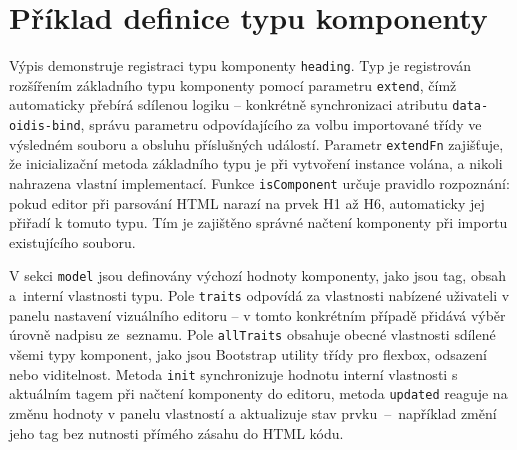 \chapter{Příklad definice typu komponenty}
\label{lst:createtype}

Výpis demonstruje registraci typu komponenty \texttt{heading}. Typ je registrován rozšířením základního typu komponenty pomocí parametru \texttt{extend}, čímž automaticky přebírá sdílenou logiku -- konkrétně synchronizaci atributu \texttt{data-oidis-bind}, správu parametru odpovídajícího za volbu importované třídy ve výsledném souboru a obsluhu příslušných událostí. Parametr \texttt{extendFn} zajišťuje, že inicializační metoda základního typu je při vytvoření instance volána, a nikoli nahrazena vlastní implementací. Funkce \texttt{isComponent} určuje pravidlo rozpoznání: pokud editor při parsování HTML narazí na prvek H1 až H6, automaticky jej přiřadí k tomuto typu. Tím je zajištěno správné načtení komponenty při importu existujícího souboru.

V sekci \texttt{model} jsou definovány výchozí hodnoty komponenty, jako jsou tag, obsah a~interní vlastnosti typu. Pole \texttt{traits} odpovídá za vlastnosti nabízené uživateli v panelu nastavení vizuálního editoru -- v tomto konkrétním případě přidává výběr úrovně nadpisu ze~seznamu. Pole \texttt{allTraits} obsahuje obecné vlastnosti sdílené všemi typy komponent, jako jsou Bootstrap utility třídy pro flexbox, odsazení nebo viditelnost. Metoda \texttt{init} synchronizuje hodnotu interní vlastnosti s aktuálním tagem při načtení komponenty do editoru, metoda \texttt{updated} reaguje na změnu hodnoty v panelu vlastností a aktualizuje stav prvku~--~například změní jeho tag bez nutnosti přímého zásahu do HTML kódu.

